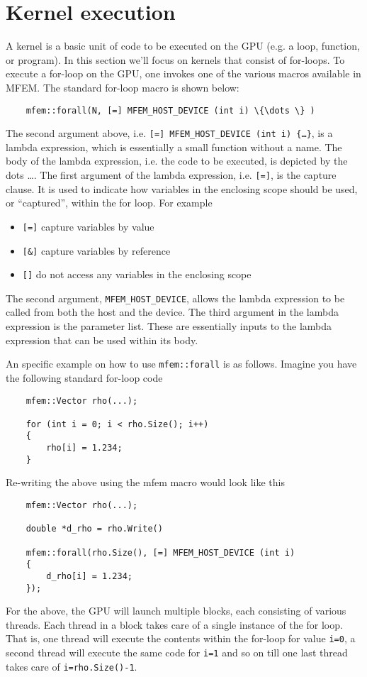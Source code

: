 \documentclass[a4paper,11pt]{article}
\begin{document}
\section{Kernel execution}
\label{sec:for_loops}
A kernel is a basic unit of code to be executed on the GPU (e.g. a loop, function, or program). In this section we'll focus on kernels that consist of for-loops. To execute a for-loop on the GPU, one invokes one of the various macros available in MFEM. The standard for-loop macro is shown below:
\begin{lstlisting}
    mfem::forall(N, [=] MFEM_HOST_DEVICE (int i) \{\dots \} )
\end{lstlisting}
The second argument above, i.e. \texttt{[=] MFEM\_HOST\_DEVICE (int i) \{\dots \}}, is a lambda expression, which is essentially a small function without a name. The body of the lambda expression, i.e. the code to be executed, is depicted by the dots \dots. The first argument of the lambda expression, i.e. \texttt{[=]}, is the capture clause. It is used to indicate how variables in the enclosing scope should be used, or ``captured'', within the for loop. For example
\begin{itemize}
    \item \texttt{[=]} capture variables by value
    \item \texttt{[\&]} capture variables by reference
    \item \texttt{[]} do not access any variables in the enclosing scope
\end{itemize}
The second argument, \texttt{MFEM\_HOST\_DEVICE}, allows the lambda expression to be called from both the host and the device. The third argument in the lambda expression is the parameter list. These are essentially inputs to the lambda expression that can be used within its body. 

An specific example on how to use \texttt{mfem::forall} is as follows. Imagine you have the following standard for-loop code
\begin{lstlisting}
    mfem::Vector rho(...);

    for (int i = 0; i < rho.Size(); i++)
    {
        rho[i] = 1.234;
    }
\end{lstlisting}
Re-writing the above using the mfem macro would look like this
\begin{lstlisting}
    mfem::Vector rho(...);

    double *d_rho = rho.Write()

    mfem::forall(rho.Size(), [=] MFEM_HOST_DEVICE (int i)
    {
        d_rho[i] = 1.234;
    });
\end{lstlisting}
For the above, the GPU will launch multiple blocks, each consisting of various threads. Each thread in a block takes care of a single instance of the for loop. That is, one thread will execute the contents within the for-loop for value \texttt{i=0}, a second thread will execute the same code for \texttt{i=1} and so on till one last thread takes care of \texttt{i=rho.Size()-1}.
\end{document}
